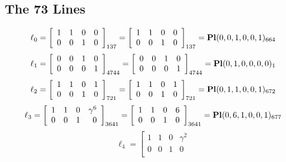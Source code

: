 \documentclass{article}
\begin{document}
{\subsection*{The 73 Lines}
$$
\ell_{0} = 
\left[
\begin{array}{*{4}{r}}
1 & 1 & 0 & 0\\
0 & 0 & 1 & 0\\
\end{array}
\right]
_{137}
=
\left[
\begin{array}{*{4}c}
1  & 1  & 0  & 0\\
0  & 0  & 1  & 0\\
\end{array}
\right]_{137}
={\rm\bf Pl}(0,0,1,0,0,1 )_{664}$$
$$
\ell_{1} = 
\left[
\begin{array}{*{4}{r}}
0 & 0 & 1 & 0\\
0 & 0 & 0 & 1\\
\end{array}
\right]
_{4744}
=
\left[
\begin{array}{*{4}c}
0  & 0  & 1  & 0\\
0  & 0  & 0  & 1\\
\end{array}
\right]_{4744}
={\rm\bf Pl}(0,1,0,0,0,0 )_{1}$$
$$
\ell_{2} = 
\left[
\begin{array}{*{4}{r}}
1 & 1 & 0 & 1\\
0 & 0 & 1 & 0\\
\end{array}
\right]
_{721}
=
\left[
\begin{array}{*{4}c}
1  & 1  & 0  & 1\\
0  & 0  & 1  & 0\\
\end{array}
\right]_{721}
={\rm\bf Pl}(0,1,1,0,0,1 )_{672}$$
$$
\ell_{3} = 
\left[
\begin{array}{*{4}{r}}
1 & 1 & 0 & \gamma^{6}\\
0 & 0 & 1 & 0\\
\end{array}
\right]
_{3641}
=
\left[
\begin{array}{*{4}c}
1  & 1  & 0  & 6\\
0  & 0  & 1  & 0\\
\end{array}
\right]_{3641}
={\rm\bf Pl}(0,6,1,0,0,1 )_{677}$$
$$
\ell_{4} = 
\left[
\begin{array}{*{4}{r}}
1 & 1 & 0 & \gamma^{2}\\
0 & 0 & 1 & 0\\

\end{array}$$}
\end{document}
